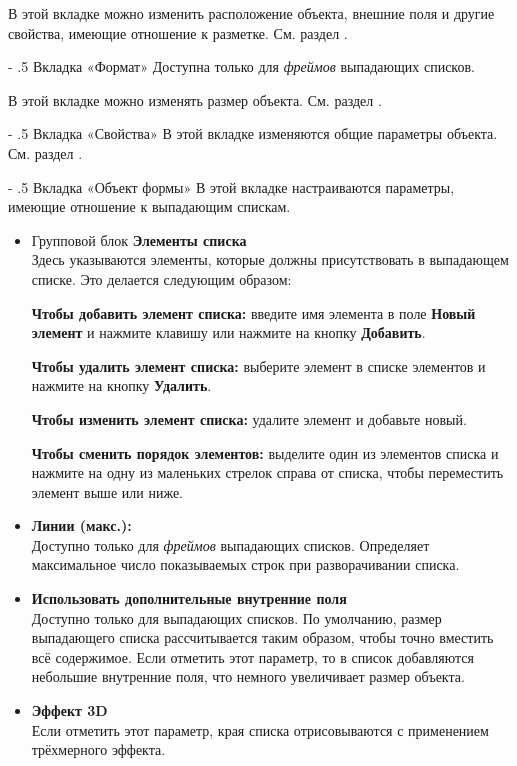 ﻿\documentclass[a4paper,10pt]{article}
\makeatletter
\renewcommand\paragraph{%
   \@startsection{paragraph}{4}{0mm}%
      {-\baselineskip}%
      {.5\baselineskip}%
      {\normalfont\normalsize\bfseries}}
\makeatother
\begin{document}
В этой вкладке можно изменить расположение объекта, внешние поля и другие свойства, имеющие отношение к разметке. См. раздел .

\paragraph{Вкладка «Формат»}
Доступна только для \textit{фреймов} выпадающих списков.

В этой вкладке можно изменять размер объекта. См. раздел .

\paragraph{Вкладка «Свойства»}
В этой вкладке изменяются общие параметры объекта. См. раздел .

\paragraph{Вкладка «Объект формы»}
В этой вкладке настраиваются параметры, имеющие отношение к выпадающим спискам.

\begin{itemize}
 \item Групповой блок \textbf{Элементы списка}\\
 Здесь указываются элементы, которые должны присутствовать в выпадающем списке. Это делается следующим образом:
 
 \textbf{Чтобы добавить элемент списка:} введите имя элемента в поле \textbf{Новый элемент} и нажмите клавишу  или нажмите на кнопку \textbf{Добавить}.
 
 \textbf{Чтобы удалить элемент списка:} выберите элемент в списке элементов и нажмите на кнопку \textbf{Удалить}.
 
 \textbf{Чтобы изменить элемент списка:} удалите элемент и добавьте новый.
 
 \textbf{Чтобы сменить порядок элементов:} выделите один из элементов списка и нажмите на одну из маленьких стрелок справа от списка, чтобы переместить элемент выше или ниже.
 \item \textbf{Линии (макс.):} \\
 Доступно только для \textit{фреймов} выпадающих списков. Определяет максимальное число показываемых строк при разворачивании списка.
 \item \textbf{Использовать дополнительные внутренние поля}\\
 Доступно только для выпадающих списков. По умолчанию, размер выпадающего списка рассчитывается таким образом, чтобы точно вместить всё содержимое. Если отметить этот параметр, то в список добавляются небольшие внутренние поля, что немного увеличивает размер объекта.
 \item \textbf{Эффект 3D}\\
 Если отметить этот параметр, края списка отрисовываются с применением трёхмерного эффекта.
 \end{itemize}
 
\end{document}
